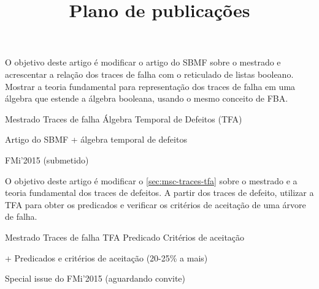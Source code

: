 \documentclass[a5paper,portuges]{article}
\title{Plano de publicações}
\begin{document}
\maketitle

\begin{artigo}
\label{sec:msc-traces-tfa}
\begin{objetivo}
O objetivo deste artigo é modificar o artigo do SBMF sobre o mestrado e acrescentar a relação dos traces de falha com o reticulado de listas booleano. Mostrar a teoria fundamental para representação dos traces de falha em uma álgebra que estende a álgebra booleana, usando o mesmo conceito de FBA.
\end{objetivo}
\begin{fluxo}
Mestrado \passofluxo Traces de falha \passofluxo Álgebra Temporal de Defeitos (TFA)
\end{fluxo}

\begin{paraconseguir}
Artigo do SBMF + álgebra temporal de defeitos
\end{paraconseguir}

\begin{submissao}
  \item FMi'2015 (submetido)
\end{submissao}

\end{artigo}

\begin{artigo}
\label{sec:criterios-aceitacao}
\begin{objetivo}
O objetivo deste artigo é modificar o \cref{sec:msc-traces-tfa} sobre o mestrado e a teoria fundamental dos traces de defeitos. A partir dos traces de defeito, utilizar a TFA para obter os predicados e verificar os critérios de aceitação de uma árvore de falha.
\end{objetivo}
\begin{fluxo}
Mestrado \passofluxo Traces de falha \passofluxo TFA \passofluxo Predicado \passofluxo Critérios de aceitação
\end{fluxo}
\begin{paraconseguir}
 + Predicados e critérios de aceitação (20-25\% a mais)
\end{paraconseguir}
\begin{submissao}
  \item Special issue do FMi'2015 (aguardando convite)
\end{submissao}
\end{artigo}
\end{document}
